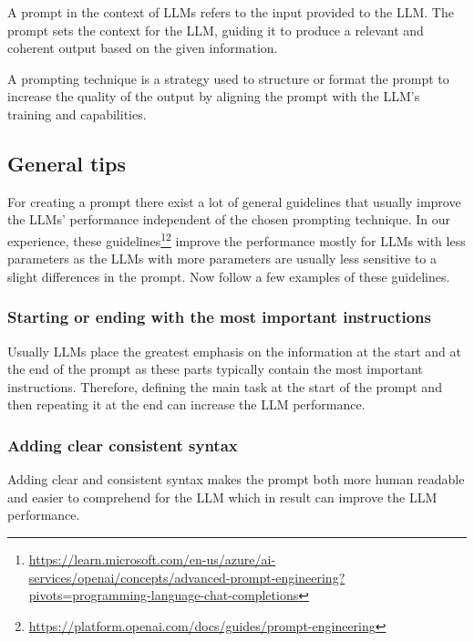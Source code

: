 A prompt in the context of LLMs refers to the input provided to the LLM. The prompt sets the context for the LLM, guiding it to produce a relevant and coherent output based on the given information.

A prompting technique is a strategy used to structure or format the prompt to increase the quality of the output by aligning the prompt with the LLM's training and capabilities.


\subsection{General tips}
\label{prompt_general_tips}

For creating a prompt there exist a lot of general guidelines that usually improve the LLMs' performance independent of the chosen prompting technique. In our experience, these guidelines\footnote{\url{https://learn.microsoft.com/en-us/azure/ai-services/openai/concepts/advanced-prompt-engineering?pivots=programming-language-chat-completions}}\footnote{\url{https://platform.openai.com/docs/guides/prompt-engineering}} improve the performance mostly for LLMs with less parameters as the LLMs with more parameters are usually less sensitive to a slight differences in the prompt. Now follow a few examples of these guidelines.

\subsubsection{Starting or ending with the most important instructions}
Usually LLMs place the greatest emphasis on the information at the start and at the end of the prompt as these parts typically contain the most important instructions. Therefore, defining the main task at the start of the prompt and then repeating it at the end can increase the LLM performance.


\subsubsection{Adding clear consistent syntax}
Adding clear and consistent syntax makes the prompt both more human readable and easier to comprehend for the LLM which in result can improve the LLM performance.



